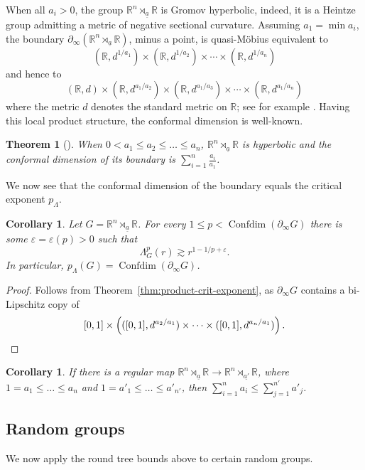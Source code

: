 \documentclass[11pt]{amsart}
\numberwithin{equation}{section}
\newtheorem{theorem}[equation]{Theorem}
\newtheorem{corollary}[equation]{Corollary}
\theoremstyle{citing}
\DeclareMathOperator{\Confdim}{Confdim}
\newcommand{\bdry}{\partial_\infty}
\newcommand{\R}{\mathbb{R}}
\newcommand{\pcrit}{p_{\Lambda}}
\numberwithin{equation}{section}
\begin{document}
When all $a_i > 0$, the group $\R^n\rtimes_{\underline{a}}\R$ is Gromov hyperbolic, indeed, it is a Heintze group admitting a metric of negative sectional curvature.
Assuming $a_1=\min a_i$, the boundary $\bdry (\R^n\rtimes_{\underline{a}}\R)$, minus a point, is quasi-M\"obius equivalent to
\[
	(\R,d^{1/a_1}) \times(\R,d^{1/a_2}) \times \cdots \times (\R,d^{1/a_n})
\]
and hence to 
\[
	(\R,d) \times(\R,d^{a_1/a_2}) \times (\R,d^{a_1/a_3}) \times \cdots \times (\R,d^{a_1/a_n})
\]
where the metric $d$ denotes the standard metric on $\R$; see for example \cite[Section 2.5]{Dymarz-10-diagonal-Tukia}.  Having this local product structure, the conformal dimension is well-known.

\begin{theorem}[{\cite[Example 3.4]{Pan-89-cdim}}]  When $0 < a_1\leq a_2 \leq \ldots \leq a_n$, $\R^n\rtimes_{\underline{a}}\R$ is hyperbolic and the conformal dimension of its boundary is $\sum_{i=1}^n \frac{a_i}{a_1}$.
\end{theorem}

We now see that the conformal dimension of the boundary equals the critical exponent $\pcrit$.
\begin{corollary}\label{cor:crit-exponent-heintze}
	Let $G=\R^n\rtimes_{\underline{a}}\R$. For every $1\leq p < \Confdim(\bdry G)$ there is some $\varepsilon=\varepsilon(p)>0$ such that
\[
 \Lambda^p_G(r)\gtrsim r^{1-1/p+\varepsilon}.
\]
	In particular, $\pcrit(G) = \Confdim(\bdry G)$.
\end{corollary}
\begin{proof}
	Follows from Theorem~\ref{thm:product-crit-exponent}, as $\bdry G$ contains a bi-Lipschitz copy of
	\[
		[0,1] \times \left( ([0,1],d^{a_2/a_1}) \times \cdots \times ([0,1], d^{a_n/a_1})\right). \qedhere
	\]
\end{proof}

\begin{corollary} If there is a regular map $\R^n\rtimes_{\underline{a}}\R\to\R^n\rtimes_{\underline{a'}}\R$, where $1= a_1\leq \ldots \leq a_n$ and $1= a'_1\leq \ldots \leq a'_{n'}$, then $\sum_{i=1}^n a_i \leq \sum_{j=1}^{n'} a'_j$.
\end{corollary}


\subsection{Random groups}
\label{ssec:random-groups}

We now apply the round tree bounds above to certain random groups.   
\end{document}
